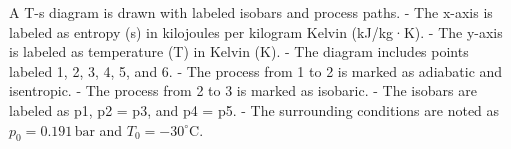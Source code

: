 A T-s diagram is drawn with labeled isobars and process paths.  
- The x-axis is labeled as entropy (s) in kilojoules per kilogram Kelvin (kJ/kg·K).  
- The y-axis is labeled as temperature (T) in Kelvin (K).  
- The diagram includes points labeled 1, 2, 3, 4, 5, and 6.  
- The process from 1 to 2 is marked as adiabatic and isentropic.  
- The process from 2 to 3 is marked as isobaric.  
- The isobars are labeled as p1, p2 = p3, and p4 = p5.  
- The surrounding conditions are noted as \( p_0 = 0.191 \, \text{bar} \) and \( T_0 = -30^\circ \text{C} \).